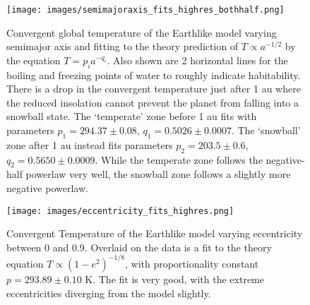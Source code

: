\documentclass[12pt, onecolumn]{revtex4-2}    %
\begin{document}
\begin{figure}
    \texttt{[image: images/semimajoraxis\_fits\_highres\_bothhalf.png]}
    \caption{Convergent global temperature of the Earthlike model varying semimajor axis and fitting to the theory prediction of $T \propto a^{-1/2}$ by the equation $T = p_i a^{-q_i}$.
        Also shown are 2 horizontal lines for the boiling and freezing points of water to roughly indicate habitability.
        There is a drop in the convergent temperature just after 1 au where the reduced insolation cannot prevent the planet from falling into a snowball state.
        The `temperate' zone before 1 au fits with parameters $p_1 = 294.37 \pm 0.08$, $q_1 = 0.5026 \pm 0.0007$.
        The `snowball' zone after 1 au instead fits parameters $p_2 = 203.5 \pm 0.6$, $q_2 = 0.5650 \pm 0.0009$.
        While the temperate zone follows the negative-half powerlaw very well, the snowball zone follows a slightly more negative powerlaw.}
    \label{fig:temperature_semimajoraxis}
\end{figure}

\begin{figure}
    \texttt{[image: images/eccentricity\_fits\_highres.png]}
    \caption{
        Convergent Temperature of the Earthlike model varying eccentricity between 0 and 0.9.
        Overlaid on the data is a fit to the theory equation $T\propto(1-e^2)^{-1/8}$, with proportionality constant $p=293.89 \pm 0.10$ K.
        The fit is very good, with the extreme eccentricities diverging from the model slightly.
    }
    \label{fig:temperature_eccentricity}
\end{figure}

\end{document}
